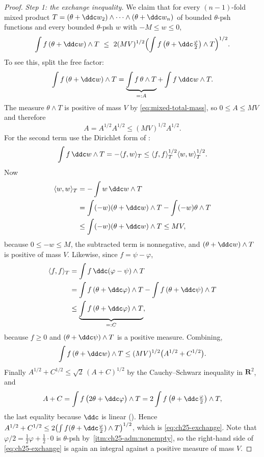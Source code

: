 \begin{proof}
\emph{Step 1: the exchange inequality.}  We claim that for every
$(n-1)$-fold mixed product
$T=(\theta+\ddc w_2)\wedge\cdots\wedge(\theta+\ddc w_n)$ of bounded
$\theta$-psh functions and every bounded $\theta$-psh $w$ with
$-M\leq w\leq0$,
\begin{equation}
\label{eq:ch25-exchange}
 \int f\,(\theta+\ddc w)\wedge T
 \ \leq\ 2(MV)^{1/2}
   \Bigl(\int f\,\bigl(\theta+\ddc\tfrac\varphi2\bigr)\wedge T\Bigr)^{1/2}.
\end{equation}
To see this, split the free factor:
\[
 \int f\,(\theta+\ddc w)\wedge T
 =\underbrace{\int f\,\theta\wedge T}_{=:A}
  +\int f\,\ddc w\wedge T .
\]
The measure $\theta\wedge T$ is positive of mass $V$ by
\eqref{eq:mixed-total-mass}, so $0\leq A\leq MV$ and therefore
\begin{equation}
\label{eq:ch25-A-term}
 A=A^{1/2}A^{1/2}\leq(MV)^{1/2}A^{1/2}.
\end{equation}
For the second term use the Dirichlet form of
:
\[
 \int f\,\ddc w\wedge T=-\langle f,w\rangle_T
 \leq\langle f,f\rangle_T^{1/2}\langle w,w\rangle_T^{1/2}.
\]
Now
\[
 \begin{aligned}
 \langle w,w\rangle_T
 &=-\int w\,\ddc w\wedge T\\
 &=\int(-w)(\theta+\ddc w)\wedge T-\int(-w)\theta\wedge T\\
 &\leq\int(-w)(\theta+\ddc w)\wedge T\leq MV,
 \end{aligned}
\]
because $0\leq-w\leq M$, the subtracted term is nonnegative, and
$(\theta+\ddc w)\wedge T$ is positive of mass $V$.  Likewise, since
$f=\psi-\varphi$,
\[
 \begin{aligned}
 \langle f,f\rangle_T
 &=\int f\,\ddc(\varphi-\psi)\wedge T\\
 &=\int f\,(\theta+\ddc\varphi)\wedge T
   -\int f\,(\theta+\ddc\psi)\wedge T\\
 &\leq\underbrace{\int f\,(\theta+\ddc\varphi)\wedge T}_{=:C},
 \end{aligned}
\]
because $f\geq0$ and $(\theta+\ddc\psi)\wedge T$ is a positive measure.
Combining,
\[
 \int f\,(\theta+\ddc w)\wedge T\leq(MV)^{1/2}\bigl(A^{1/2}+C^{1/2}\bigr).
\]
Finally $A^{1/2}+C^{1/2}\leq\sqrt2\,(A+C)^{1/2}$ by the
Cauchy--Schwarz inequality in $\mathbf R^2$, and
\[
 A+C=\int f\,\bigl(2\theta+\ddc\varphi\bigr)\wedge T
 =2\int f\,\bigl(\theta+\ddc\tfrac\varphi2\bigr)\wedge T ,
\]
the last equality because $\ddc$ is linear
().  Hence
$A^{1/2}+C^{1/2}\leq2\bigl(\int f(\theta+\ddc\frac\varphi2)\wedge
T\bigr)^{1/2}$, which is \eqref{eq:ch25-exchange}.  Note that
$\varphi/2=\frac12\varphi+\frac12\cdot0$ is $\theta$-psh by
\,\cref{itm:ch25-adm:nonempty}, so the
right-hand side of \eqref{eq:ch25-exchange} is again an integral against a
positive measure of mass $V$.


\end{proof}
